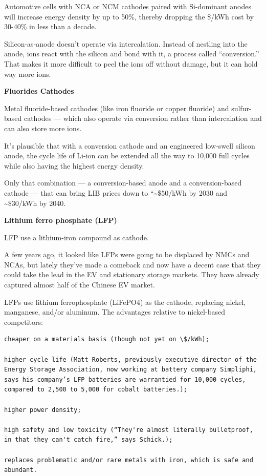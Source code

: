 \documentclass[
]{book}
\begin{document}
Automotive cells with NCA or NCM cathodes paired with Si-dominant anodes will increase energy density by up to 50\%, thereby dropping the \$/kWh cost by 30-40\% in less than a decade.

Silicon-as-anode doesn't operate via intercalation. Instead of nestling into the anode, ions react with the silicon and bond with it, a process called ``conversion.'' That makes it more difficult to peel the ions off without damage, but it can hold way more ions.

\textbf{Fluorides Cathodes}

Metal fluoride-based cathodes (like iron fluoride or copper fluoride) and sulfur-based cathodes --- which also operate via conversion rather than intercalation and can also store more ions.

It's plausible that with a conversion cathode and an engineered low-swell silicon anode, the cycle life of Li-ion can be extended all the way to 10,000 full cycles while also having the highest energy density.

Only that combination --- a conversion-based anode and a conversion-based cathode --- that can bring LIB prices down to ``\textasciitilde\$50/kWh by 2030 and \textasciitilde\$30/kWh by 2040.

\textbf{Lithium ferro phosphate (LFP)}

LFP use a lithium-iron compound as cathode.

A few years ago, it looked like LFPs were going to be displaced by NMCs and NCAs, but lately they've made a comeback and now have a decent case that they could take the lead in the EV and stationary storage markets. They have already captured almost half of the Chinese EV market.

LFPs use lithium ferrophosphate (LiFePO4) as the cathode, replacing nickel, manganese, and/or aluminum. The advantages relative to nickel-based competitors:

\begin{verbatim}
cheaper on a materials basis (though not yet on \$/kWh);

higher cycle life (Matt Roberts, previously executive director of the Energy Storage Association, now working at battery company Simpliphi, says his company’s LFP batteries are warrantied for 10,000 cycles, compared to 2,500 to 5,000 for cobalt batteries.);

higher power density;

high safety and low toxicity (“They're almost literally bulletproof, in that they can't catch fire,” says Schick.);

replaces problematic and/or rare metals with iron, which is safe and abundant.
\end{verbatim}
\end{document}
